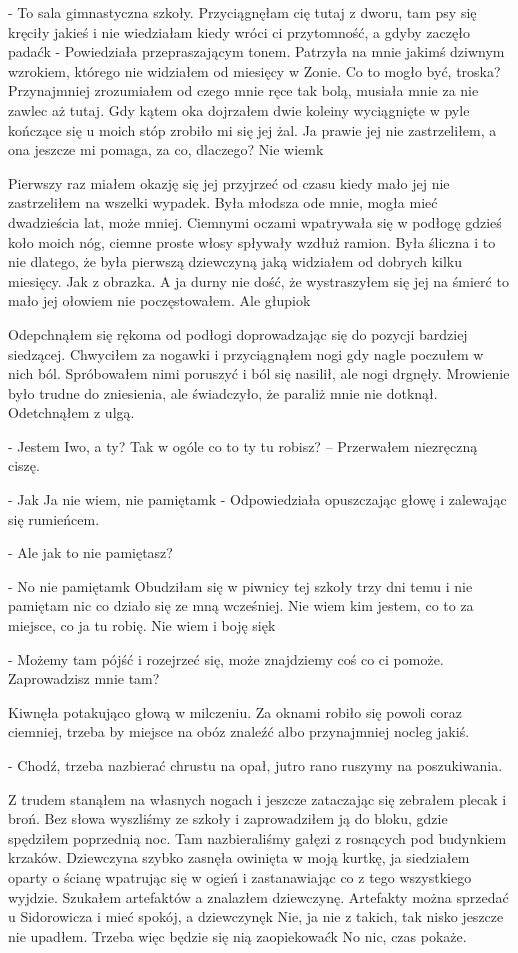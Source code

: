 \documentclass[../MAIN.tex]{subfiles}
\begin{document}
- To sala gimnastyczna szkoły. Przyciągnęłam cię tutaj z dworu, tam psy się kręciły jakieś i nie wiedziałam kiedy wróci ci przytomność, a gdyby zaczęło padać\3k - Powiedziała przepraszającym tonem. Patrzyła na mnie jakimś dziwnym wzrokiem, którego nie widziałem od miesięcy w Zonie. Co to mogło być, troska? Przynajmniej zrozumiałem od czego mnie ręce tak bolą, musiała mnie za nie zawlec aż tutaj. Gdy kątem oka dojrzałem dwie koleiny wyciągnięte w pyle kończące się u moich stóp zrobiło mi się jej żal. Ja prawie jej nie zastrzeliłem, a ona jeszcze mi pomaga, za co, dlaczego? Nie wiem\3k

Pierwszy raz miałem okazję się jej przyjrzeć od czasu kiedy mało jej nie zastrzeliłem na wszelki wypadek. Była młodsza ode mnie, mogła mieć dwadzieścia lat, może mniej. Ciemnymi oczami wpatrywała się w podłogę gdzieś koło moich nóg, ciemne proste włosy spływały wzdłuż ramion. Była śliczna i to nie dlatego, że była pierwszą dziewczyną jaką widziałem od dobrych kilku miesięcy. Jak z obrazka. A ja durny nie dość, że wystraszyłem się jej na śmierć to mało jej ołowiem nie poczęstowałem. Ale głupio\3k

Odepchnąłem się rękoma od podłogi doprowadzając się do pozycji bardziej siedzącej. Chwyciłem za nogawki i przyciągnąłem nogi gdy nagle poczułem w nich ból. Spróbowałem nimi poruszyć i ból się nasilił, ale nogi drgnęły. Mrowienie było trudne do zniesienia, ale świadczyło, że paraliż mnie nie dotknął. Odetchnąłem z ulgą.

- Jestem Iwo, a ty? Tak w ogóle co to ty tu robisz? – Przerwałem niezręczną ciszę.

- Ja\3k Ja nie wiem, nie pamiętam\3k - Odpowiedziała opuszczając głowę i zalewając się rumieńcem.

- Ale jak to nie pamiętasz?

- No nie pamiętam\3k Obudziłam się w piwnicy tej szkoły trzy dni temu i nie pamiętam nic co działo się ze mną wcześniej. Nie wiem kim jestem, co to za miejsce, co ja tu robię. Nie wiem i boję się\3k

- Możemy tam pójść i rozejrzeć się, może znajdziemy coś co ci pomoże. Zaprowadzisz mnie tam?

Kiwnęła potakująco głową w milczeniu. Za oknami robiło się powoli coraz ciemniej, trzeba by miejsce na obóz znaleźć albo przynajmniej nocleg jakiś.

- Chodź, trzeba nazbierać chrustu na opał, jutro rano ruszymy na poszukiwania.

Z trudem stanąłem na własnych nogach i jeszcze zataczając się zebrałem plecak i broń. Bez słowa wyszliśmy ze szkoły i zaprowadziłem ją do bloku, gdzie spędziłem poprzednią noc. Tam nazbieraliśmy gałęzi z rosnących pod budynkiem krzaków. Dziewczyna szybko zasnęła owinięta w moją kurtkę, ja siedziałem oparty o ścianę wpatrując się w ogień i zastanawiając co z tego wszystkiego wyjdzie. Szukałem artefaktów a znalazłem dziewczynę. Artefakty można sprzedać u Sidorowicza i mieć spokój, a dziewczynę\3k Nie, ja nie z takich, tak nisko jeszcze nie upadłem. Trzeba więc będzie się nią zaopiekować\3k No nic, czas pokaże.
\end{document}
